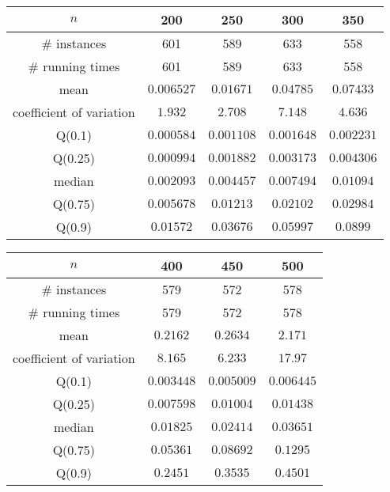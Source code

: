 \begin{tabular}{c|cccc} 
\hline 
$n$ & 200 & 250 & 300 & 350 \tabularnewline 
\hline 
\# instances & 601 & 589 & 633 & 558 \tabularnewline 
\# running times & 601 & 589 & 633 & 558 \tabularnewline 
mean & $0.006527$ & $0.01671$ & $0.04785$ & $0.07433$ \tabularnewline 
coefficient of variation & $1.932$ & $2.708$ & $7.148$ & $4.636$ \tabularnewline 
Q(0.1) & $0.000584$ & $0.001108$ & $0.001648$ & $0.002231$ \tabularnewline 
Q(0.25) & $0.000994$ & $0.001882$ & $0.003173$ & $0.004306$ \tabularnewline 
median & $0.002093$ & $0.004457$ & $0.007494$ & $0.01094$ \tabularnewline 
Q(0.75) & $0.005678$ & $0.01213$ & $0.02102$ & $0.02984$ \tabularnewline 
Q(0.9) & $0.01572$ & $0.03676$ & $0.05997$ & $0.0899$ \tabularnewline 
\hline 
\end{tabular} 
\medskip{} 

\begin{tabular}{c|ccc} 
\hline 
$n$ & 400 & 450 & 500 \tabularnewline 
\hline 
\# instances & 579 & 572 & 578 \tabularnewline 
\# running times & 579 & 572 & 578 \tabularnewline 
mean & $0.2162$ & $0.2634$ & $2.171$ \tabularnewline 
coefficient of variation & $8.165$ & $6.233$ & $17.97$ \tabularnewline 
Q(0.1) & $0.003448$ & $0.005009$ & $0.006445$ \tabularnewline 
Q(0.25) & $0.007598$ & $0.01004$ & $0.01438$ \tabularnewline 
median & $0.01825$ & $0.02414$ & $0.03651$ \tabularnewline 
Q(0.75) & $0.05361$ & $0.08692$ & $0.1295$ \tabularnewline 
Q(0.9) & $0.2451$ & $0.3535$ & $0.4501$ \tabularnewline 
\hline 
\end{tabular} 
\medskip{} 


